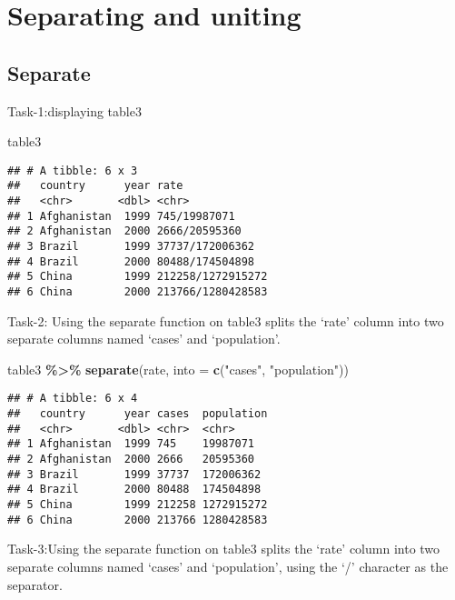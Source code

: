 \documentclass[
]{article}
\newenvironment{Shaded}{\begin{snugshade}}{\end{snugshade}}
\newcommand{\AttributeTok}[1]{\textcolor[rgb]{0.13,0.29,0.53}{#1}}
\newcommand{\FunctionTok}[1]{\textcolor[rgb]{0.13,0.29,0.53}{\textbf{#1}}}
\newcommand{\NormalTok}[1]{#1}
\newcommand{\SpecialCharTok}[1]{\textcolor[rgb]{0.81,0.36,0.00}{\textbf{#1}}}
\newcommand{\StringTok}[1]{\textcolor[rgb]{0.31,0.60,0.02}{#1}}
\begin{document}
\hypertarget{separating-and-uniting}{%
\section{Separating and uniting}\label{separating-and-uniting}}

\hypertarget{separate}{%
\subsection{Separate}\label{separate}}

Task-1:displaying table3

\begin{Shaded}
\begin{Highlighting}[]
\NormalTok{ table3}
\end{Highlighting}
\end{Shaded}

\begin{verbatim}
## # A tibble: 6 x 3
##   country      year rate             
##   <chr>       <dbl> <chr>            
## 1 Afghanistan  1999 745/19987071     
## 2 Afghanistan  2000 2666/20595360    
## 3 Brazil       1999 37737/172006362  
## 4 Brazil       2000 80488/174504898  
## 5 China        1999 212258/1272915272
## 6 China        2000 213766/1280428583
\end{verbatim}

Task-2: Using the separate function on table3 splits the `rate' column
into two separate columns named `cases' and `population'.

\begin{Shaded}
\begin{Highlighting}[]
\NormalTok{table3 }\SpecialCharTok{\%\textgreater{}\%} 
  \FunctionTok{separate}\NormalTok{(rate, }\AttributeTok{into =} \FunctionTok{c}\NormalTok{(}\StringTok{"cases"}\NormalTok{, }\StringTok{"population"}\NormalTok{))}
\end{Highlighting}
\end{Shaded}

\begin{verbatim}
## # A tibble: 6 x 4
##   country      year cases  population
##   <chr>       <dbl> <chr>  <chr>     
## 1 Afghanistan  1999 745    19987071  
## 2 Afghanistan  2000 2666   20595360  
## 3 Brazil       1999 37737  172006362 
## 4 Brazil       2000 80488  174504898 
## 5 China        1999 212258 1272915272
## 6 China        2000 213766 1280428583
\end{verbatim}

Task-3:Using the separate function on table3 splits the `rate' column
into two separate columns named `cases' and `population', using the `/'
character as the separator.
\end{document}
